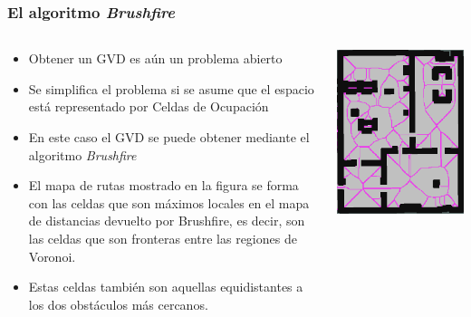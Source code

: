 \documentclass[10pt,spanish,aspectratio=1610]{beamer}
\begin{document}
\begin{frame}\frametitle{El algoritmo \textit{Brushfire}}
  \begin{columns}
    \begin{column}{0.65\textwidth}
      \begin{itemize}
      \item Obtener un GVD es aún un problema abierto
      \item Se simplifica el problema si se asume que el espacio está representado por Celdas de Ocupación
      \item En este caso el GVD se puede obtener mediante el algoritmo \textit{Brushfire}
      \item El mapa de rutas mostrado en la figura se forma con las celdas que son máximos locales en el mapa de distancias devuelto por Brushfire, es decir, son las celdas que son fronteras entre las regiones de Voronoi.
      \item Estas celdas también son aquellas equidistantes a los dos obstáculos más cercanos. 
      \end{itemize}
    \end{column}
    \begin{column}{0.35\textwidth}
      \includegraphics[width=\textwidth]{Figures/GVDFromGrid.png}
    \end{column}
  \end{columns}
\end{frame}
\end{document}
